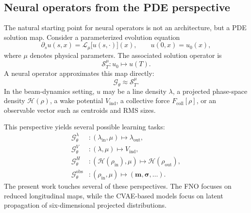\documentclass[11pt,a4paper]{article}
\begin{document}
\begin{sloppypar}
\subsection{Neural operators from the PDE perspective}
The natural starting point for neural operators is not an architecture, but a PDE solution map. Consider a parameterized evolution equation
\begin{equation}
    \partial_s u(s,x)=\mathcal{L}_{\mu}\big[u(s,\cdot)\big](x),\qquad u(0,x)=u_0(x),
    \label{eq:generic_pde_operator_form}
\end{equation}
where $\mu$ denotes physical parameters. The associated solution operator is
\begin{equation}
    \mathcal{S}^{\mu}_T:u_0\mapsto u(T).
    \label{eq:pde_solution_map}
\end{equation}
A neural operator approximates this map directly:
\begin{equation}
    \mathcal{G}_{\theta}\approx \mathcal{S}^{\mu}_T.
\end{equation}
In the beam-dynamics setting, $u$ may be a line density $\lambda$, a projected phase-space density $\mathcal{H}(\rho)$, a wake potential $V_{\mathrm{ind}}$, a collective force $F_{\mathrm{coll}}[\rho]$, or an observable vector such as centroids and RMS sizes.

This perspective yields several possible learning tasks:
\begin{align}
    \mathcal{G}^{\lambda}_{\theta}&:(\lambda_{\mathrm{in}},\mu)\mapsto\lambda_{\mathrm{out}},\\
    \mathcal{G}^{V}_{\theta}&:(\lambda,\mu)\mapsto V_{\mathrm{ind}},\\
    \mathcal{G}^{H}_{\theta}&:(\mathcal{H}(\rho_{\mathrm{in}}),\mu)\mapsto\mathcal{H}(\rho_{\mathrm{out}}),\\
    \mathcal{G}^{\mathrm{obs}}_{\theta}&:(\rho_{\mathrm{in}},\mu)\mapsto(\bm{m},\bm{\sigma},\ldots).
\end{align}
The present work touches several of these perspectives. The FNO focuses on reduced longitudinal maps, while the CVAE-based models focus on latent propagation of six-dimensional projected distributions.


\end{sloppypar}
\end{document}
